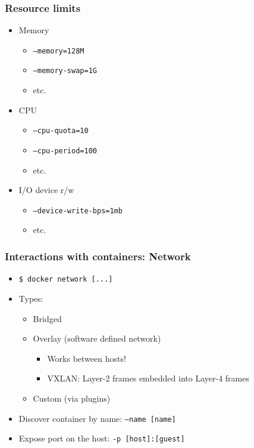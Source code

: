 \documentclass[xetex,mathserif,serif]{beamer}
\begin{document}
  \begin{frame}
    \frametitle{Resource limits}
    \begin{itemize}
      \item Memory
        \begin{itemize}
          \item \texttt{--memory=128M}
          \item \texttt{--memory-swap=1G}
          \item etc.
        \end{itemize}
      \item CPU
        \begin{itemize}
          \item \texttt{--cpu-quota=10}
          \item \texttt{--cpu-period=100}
          \item etc.
        \end{itemize}
      \item I/O device r/w
        \begin{itemize}
          \item \texttt{--device-write-bps=1mb}
          \item etc.
        \end{itemize}
    \end{itemize}
  \end{frame}
  \begin{frame}
    \frametitle{Interactions with containers: Network}
    \begin{itemize}
      \item \texttt{\$ docker network [...]}
      \item Types:
        \begin{itemize}
          \item Bridged
          \item Overlay (software defined network)
            \begin{itemize}
              \item Works between hosts!
              \item VXLAN: Layer-2 frames embedded into Layer-4 frames
            \end{itemize}
          \item Custom (via plugins)
        \end{itemize}
      \item Discover container by name: \texttt{--name [name]}
      \item Expose port on the host: \texttt{-p [host]:[guest]}
    \end{itemize}
  \end{frame}
\end{document}
